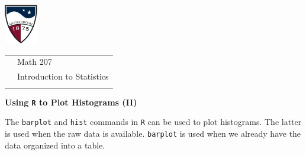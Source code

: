 \documentclass[10pt]{article}
\begin{document}
\pagestyle{empty}
\lstset{language=R, showspaces=false, showstringspaces=false}

\href{http://www.su.edu}{\includegraphics[height=1.75cm]{sulogo.eps}}
\vspace{-1.69cm}

{\small
\begin{tabular}{cl}
& Math 207\\ & Introduction to  Statistics\\
\hspace{5in} & %
\end{tabular}
}
\setlength{\baselineskip}{1.05\baselineskip}
\bigskip

\begin{center}
\textbf{\large  Using \texttt{R} to Plot Histograms (II)}
\end{center}
\medskip

The \texttt{barplot} and \texttt{hist} commands in \texttt{R} can be used
to plot histograms.  The latter is used when the raw data is available.
\texttt{barplot} is used when we already have the data organized into 
a table.
\medskip

\newcommand{\SUBX}{\smallskip\hspace{10pt}}
\newcommand{\BSK}{\vspace{.14in}}
\end{document}
